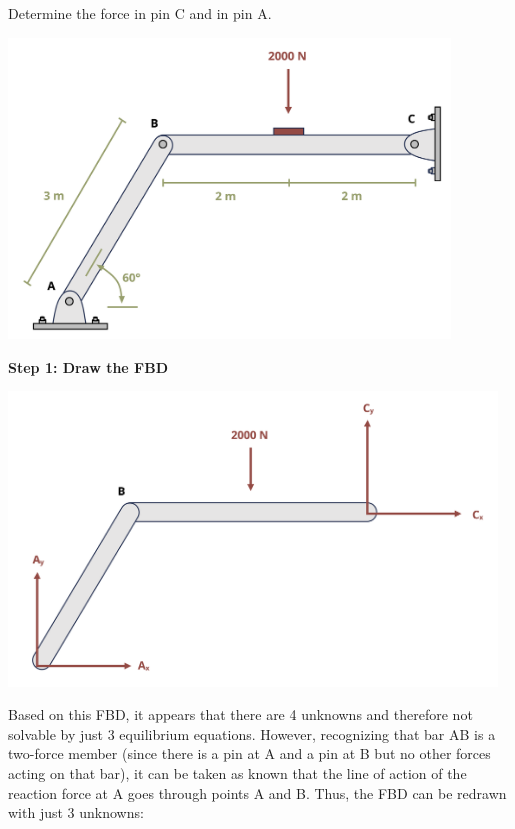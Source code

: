 \documentclass[
  letterpaper,
  DIV=11,
  numbers=noendperiod]{scrreprt}
\begin{document}
\begin{tcolorbox}[enhanced jigsaw, colback=white, colframe=quarto-callout-note-color-frame, leftrule=.75mm, opacitybacktitle=0.6, colbacktitle=quarto-callout-note-color!10!white, arc=.35mm, bottomrule=.15mm, breakable, title={Example 1.2}, left=2mm, titlerule=0mm, toptitle=1mm, toprule=.15mm, opacityback=0, rightrule=.15mm, coltitle=black, bottomtitle=1mm]

Determine the force in pin C and in pin A.

\begin{center}
\includegraphics[width=4.61458in,height=\textheight]{images/CH1 PNGs/example 1.2 part 1.png}
\end{center}

\textbf{Step 1: Draw the FBD}

\begin{center}
\includegraphics[width=5.10417in,height=\textheight]{images/CH1 PNGs/example 1.2 part 2.png}
\end{center}

Based on this FBD, it appears that there are 4 unknowns and therefore
not solvable by just 3 equilibrium equations. However, recognizing that
bar AB is a two-force member (since there is a pin at A and a pin at B
but no other forces acting on that bar), it can be taken as known that
the line of action of the reaction force at A goes through points A and
B. Thus, the FBD can be redrawn with just 3 unknowns:


\end{tcolorbox}
\end{document}
